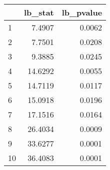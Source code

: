 \begin{tabular}{lrr}
\toprule
{} &  lb\_stat &  lb\_pvalue \\
\midrule
1  &   7.4907 &     0.0062 \\
2  &   7.7501 &     0.0208 \\
3  &   9.3885 &     0.0245 \\
4  &  14.6292 &     0.0055 \\
5  &  14.7119 &     0.0117 \\
6  &  15.0918 &     0.0196 \\
7  &  17.1516 &     0.0164 \\
8  &  26.4034 &     0.0009 \\
9  &  33.6277 &     0.0001 \\
10 &  36.4083 &     0.0001 \\
\bottomrule
\end{tabular}
